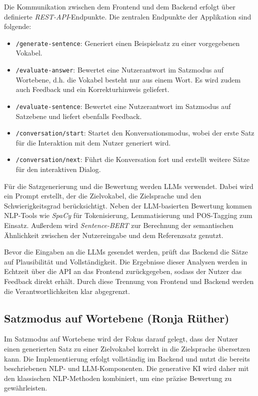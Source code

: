 Die Kommunikation zwischen dem Frontend und dem Backend erfolgt über definierte \textit{REST-API}-Endpunkte.
Die zentralen Endpunkte der Applikation sind folgende:
\begin{itemize}
    \item \texttt{/generate-sentence}: Generiert einen Beispielsatz zu einer vorgegebenen Vokabel.
    \item \texttt{/evaluate-answer}: Bewertet eine Nutzerantwort im Satzmodus auf Wortebene, d.h. die Vokabel besteht nur aus einem Wort. Es wird zudem auch Feedback und ein Korrekturhinweis geliefert.
    \item \texttt{/evaluate-sentence}: Bewertet eine Nutzerantwort im Satzmodus auf Satzebene und liefert ebenfalls Feedback.
    \item \texttt{/conversation/start}: Startet den Konversationsmodus, wobei der erste Satz für die Interaktion mit dem Nutzer generiert wird.
    \item \texttt{/conversation/next}: Führt die Konversation fort und erstellt weitere Sätze für den interaktiven Dialog.
\end{itemize}

Für die Satzgenerierung und die Bewertung werden LLMs verwendet. Dabei wird ein Prompt erstellt, der die Zielvokabel, die Zielsprache und den Schwierigkeitsgrad berücksichtigt.
Neben der LLM-basierten Bewertung kommen NLP-Tools wie \textit{SpaCy} für Tokenisierung, Lemmatisierung und POS-Tagging zum Einsatz.
Außerdem wird \textit{Sentence-BERT} zur Berechnung der semantischen Ähnlichkeit zwischen der Nutzereingabe und dem Referenzsatz genutzt.

Bevor die Eingaben an die LLMs gesendet werden, prüft das Backend die Sätze auf Plausibilität und Vollständigkeit.
Die Ergebnisse dieser Analysen werden in Echtzeit über die API an das Frontend zurückgegeben, sodass der Nutzer das Feedback direkt erhält. 
Durch diese Trennung von Frontend und Backend werden die Verantwortlichkeiten klar abgegrenzt.

\subsection{Satzmodus auf Wortebene (Ronja Rüther)}
Im Satzmodus auf Wortebene wird der Fokus darauf gelegt, dass der Nutzer einen generierten Satz zu einer Zielvokabel korrekt in die Zielsprache übersetzen kann. 
Die Implementierung erfolgt vollständig im Backend und nutzt die bereits beschriebenen NLP- und LLM-Komponenten.
Die generative KI wird daher mit den klassischen NLP-Methoden kombiniert, um eine präzise Bewertung zu gewährleisten.

